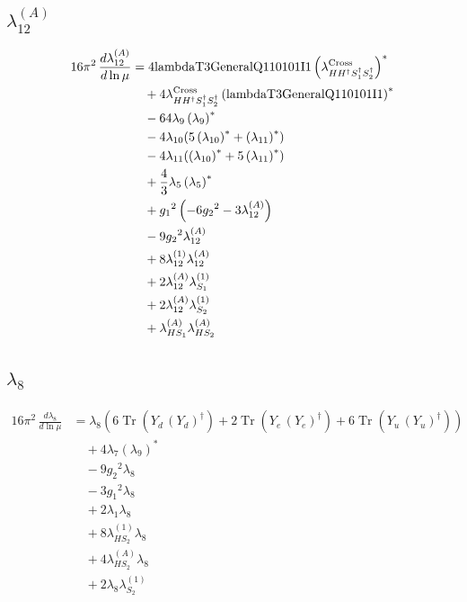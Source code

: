 \documentclass[10pt,a4paper]{article}
\begin{document}
\subsection*{$\lambda_{12}^{(A)}$}
\begin{align*}
16\pi^2\,\frac{d \lambda_{12}^{(A)}}{d\ln\mu} &=4 \text{lambdaT3GeneralQ110101I1} \left({\lambda_{H H^\dagger S_1^\dagger S_2^\dagger}^{\rm Cross}}\right)^{*} \\
&\quad +4 {\lambda_{H H^\dagger S_1^\dagger S_2^\dagger}^{\rm Cross}} \left(\text{lambdaT3GeneralQ110101I1}\right)^{*} \\
&\quad -64 {\lambda_{9}} \left({\lambda_{9}}\right)^{*} \\
&\quad -4 {\lambda_{10}} (5 \left({\lambda_{10}}\right)^{*}+\left({\lambda_{11}}\right)^{*}) \\
&\quad -4 {\lambda_{11}} (\left({\lambda_{10}}\right)^{*}+5 \left({\lambda_{11}}\right)^{*}) \\
&\quad +\frac{4}{3} {\lambda_5} \left({\lambda_5}\right)^{*} \\
&\quad +{g_1}^2 \left(-6 {g_2}^2-3 {\lambda_{12}^{(A)}}\right) \\
&\quad -9 {g_2}^2 {\lambda_{12}^{(A)}} \\
&\quad +8 {\lambda_{12}^{(1)}} {\lambda_{12}^{(A)}} \\
&\quad +2 {\lambda_{12}^{(A)}} {\lambda_{S_1}^{(1)}} \\
&\quad +2 {\lambda_{12}^{(A)}} {\lambda_{S_2}^{(1)}} \\
&\quad +{\lambda_{HS_1}^{(A)}} {\lambda_{HS_2}^{(A)}} \\
\end{align*}
\subsection*{$\lambda_{8}$}
\begin{align*}
16\pi^2\,\frac{d \lambda_{8}}{d\ln\mu} &={\lambda_{8}} (6 \operatorname{Tr}\!\left({Y_d}\,\left({Y_d}\right)^{\dagger}\right)+2 \operatorname{Tr}\!\left({Y_e}\,\left({Y_e}\right)^{\dagger}\right)+6 \operatorname{Tr}\!\left({Y_u}\,\left({Y_u}\right)^{\dagger}\right)) \\
&\quad +4 {\lambda_{7}} \left({\lambda_{9}}\right)^{*} \\
&\quad -9 {g_2}^2 {\lambda_{8}} \\
&\quad -3 {g_1}^2 {\lambda_{8}} \\
&\quad +2 {\lambda_1} {\lambda_{8}} \\
&\quad +8 {\lambda_{HS_2}^{(1)}} {\lambda_{8}} \\
&\quad +4 {\lambda_{HS_2}^{(A)}} {\lambda_{8}} \\
&\quad +2 {\lambda_{8}} {\lambda_{S_2}^{(1)}} \\
\end{align*}
\end{document}
